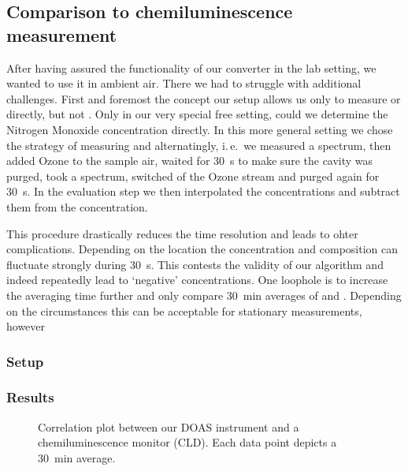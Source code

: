 \subsection{Comparison to chemiluminescence measurement}
\label{sec:cld}

After having assured the functionality of our converter in the lab
setting, we wanted to use it in ambient air. There we had to struggle
with additional challenges. First and foremost the concept our setup
allows us only to measure  or  directly, but not
. Only in our very special  free setting, could we
determine the Nitrogen Monoxide concentration directly. In this more
general setting we chose the strategy of measuring  and
 alternatingly, i.\,e.\ we measured a  spectrum, then
added Ozone to the sample air, waited for \SI{30}{\second} to make
sure the cavity was purged, took a  spectrum, switched of the
Ozone stream and purged again for \SI{30}{\second}. In the evaluation
step we then interpolated the  concentrations and subtract
them from the  concentration. 

This procedure drastically reduces the time resolution and leads to
ohter complications. Depending on the location the 
concentration and composition can fluctuate strongly during
\SI{30}{\second}. This contests the validity of our algorithm and
indeed repeatedly lead to `negative'  concentrations. One
loophole is to increase the averaging time further and only compare
\SI{30}{\minute} averages of  and . Depending on the
circumstances this can be acceptable for stationary measurements, however


\subsubsection{Setup}
\label{sec:cld-setup}

\subsubsection{Results}
\label{sec:cld-results}

\begin{figure}[htbp]
  \centering
  
  \caption{Correlation plot between our DOAS instrument and a
    chemiluminescence monitor (CLD). Each data point depicts a
    \SI{30}{\minute} average.}
  \label{fig:cld-corr}
\end{figure}


